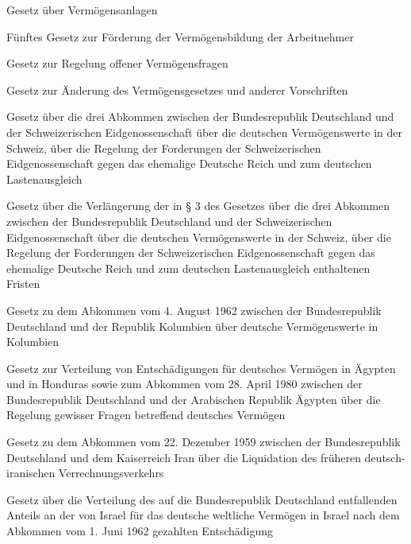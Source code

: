\item[{VermAnlG}] Gesetz über Vermögensanlagen

\item[{VermBG-2}] Fünftes Gesetz zur Förderung der Vermögensbildung der Arbeitnehmer

\item[{VermG}] Gesetz zur Regelung offener Vermögensfragen

\item[{VermRÄndG-2}] Gesetz zur Änderung des Vermögensgesetzes und anderer Vorschriften

\item[{VermRglAbkCHEG}] Gesetz über die drei Abkommen zwischen der Bundesrepublik Deutschland und der Schweizerischen Eidgenossenschaft über die deutschen Vermögenswerte in der Schweiz, über die Regelung der Forderungen der Schweizerischen Eidgenossenschaft gegen das ehemalige Deutsche Reich und zum deutschen Lastenausgleich

\item[{VermRglAbkCHEG-3G}] Gesetz über die Verlängerung der in § 3 des Gesetzes über die drei Abkommen zwischen der Bundesrepublik Deutschland und der Schweizerischen Eidgenossenschaft über die deutschen Vermögenswerte in der Schweiz, über die Regelung der Forderungen der Schweizerischen Eidgenossenschaft gegen das ehemalige Deutsche Reich und zum deutschen Lastenausgleich enthaltenen Fristen

\item[{VermRglAbkCOLG}] Gesetz zu dem Abkommen vom 4. August 1962 zwischen der Bundesrepublik Deutschland und der Republik Kolumbien über deutsche Vermögenswerte in Kolumbien

\item[{VermRglAbkEGYG}] Gesetz zur Verteilung von Entschädigungen für deutsches Vermögen in Ägypten und in Honduras sowie zum Abkommen vom 28. April 1980 zwischen der Bundesrepublik Deutschland und der Arabischen Republik Ägypten über die Regelung gewisser Fragen betreffend deutsches Vermögen

\item[{VermRglAbkIRNG}] Gesetz zu dem Abkommen vom 22. Dezember 1959 zwischen der Bundesrepublik Deutschland und dem Kaiserreich Iran über die Liquidation des früheren deutsch-iranischen Verrechnungsverkehrs

\item[{VermRglAbkISRG}] Gesetz über die Verteilung des auf die Bundesrepublik Deutschland entfallenden Anteils an der von Israel für das deutsche weltliche Vermögen in Israel nach dem Abkommen vom 1. Juni 1962 gezahlten Entschädigung

